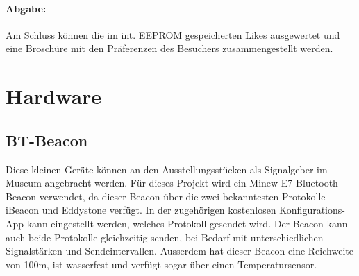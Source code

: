 \paragraph*{Abgabe:}
Am Schluss können die im int. EEPROM gespeicherten Likes ausgewertet und eine Broschüre mit den Präferenzen des Besuchers zusammengestellt werden.
\section{Hardware}
\subsection{BT-Beacon}
Diese kleinen Geräte können an den Ausstellungsstücken als Signalgeber im Museum angebracht werden. Für dieses Projekt wird ein Minew E7 Bluetooth Beacon verwendet, da dieser Beacon über die zwei bekanntesten Protokolle iBeacon und Eddystone verfügt. In der zugehörigen kostenlosen Konfigurations-App kann eingestellt werden, welches Protokoll gesendet wird. Der Beacon kann auch beide Protokolle gleichzeitig senden, bei Bedarf mit unterschiedlichen Signalstärken und Sendeintervallen. Ausserdem hat dieser Beacon eine Reichweite von 100m, ist wasserfest und verfügt sogar über einen Temperatursensor.
\newpage
